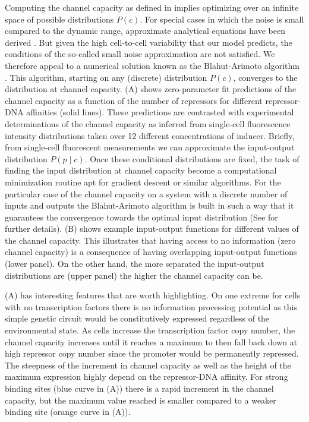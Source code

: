 Computing the channel capacity as defined in  implies
optimizing over an infinite space of possible distributions $P(c)$. For special
cases in which the noise is small compared to the dynamic range, approximate
analytical equations have been derived \cite{Tkacik2008a}. But given the high
cell-to-cell variability that our model predicts, the conditions of the
so-called small noise approximation are not satisfied. We therefore appeal to a
numerical solution known as the Blahut-Arimoto algorithm \cite{Blahut1972}. This
algorithm, starting on any (discrete) distribution $P(c)$, converges to the
distribution at channel capacity. (A) shows zero-parameter
fit predictions of the channel capacity as a function of the number of
repressors for different repressor-DNA affinities (solid lines). These
predictions are contrasted with experimental determinations of the channel
capacity as inferred from single-cell fluorescence intensity distributions taken
over 12 different concentrations of inducer. Briefly, from single-cell
fluorescent measurements we can approximate the input-output distribution $P(p
\mid c)$. Once these conditional distributions are fixed, the task of finding
the input distribution at channel capacity become a computational minimization
routine apt for gradient descent or similar algorithms. For the particular case
of the channel capacity on a system with a discrete number of inputs and
outputs the Blahut-Arimoto algorithm is built in such a way that it guarantees
the convergence towards the optimal input distribution (See
 for further details). (B) shows
example input-output functions for different values of the channel capacity.
This illustrates that having access to no information (zero channel capacity) is
a consequence of having overlapping input-output functions (lower panel). On the
other hand, the more separated the input-output distributions are (upper panel)
the higher the channel capacity can be.

(A) has interesting features that are worth highlighting. On
one extreme for cells with no transcription factors there is no information
processing potential as this simple genetic circuit would be constitutively
expressed regardless of the environmental state. As cells increase the
transcription factor copy number, the channel capacity increases until it
reaches a maximum to then fall back down at high repressor copy number since the
promoter would be permanently repressed. The steepness of the increment in
channel capacity as well as the height of the maximum expression highly depend
on the repressor-DNA affinity. For strong binding sites (blue curve in
(A)) there is a rapid increment in the channel capacity, but
the maximum value reached is smaller compared to a weaker binding site (orange
curve in (A)).

